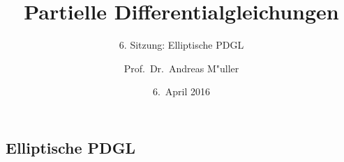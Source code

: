 \documentclass[handout]{beamer}
\title[]{Partielle Differentialgleichungen}
\subtitle{6. Sitzung: Elliptische PDGL}
\date[6.~April 2016]{6.~April 2016}
\author{Prof.~Dr.~Andreas M"uller}
\begin{document}
\begin{frame}
\section{Elliptische PDGL}
\titlepage

\end{frame}


\end{document}
